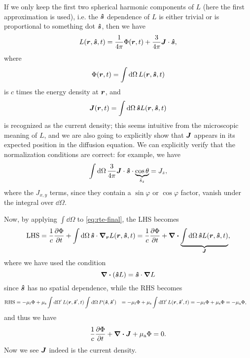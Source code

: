 \documentclass[hyperref, a4paper]{article}
\def\\{}%
\begin{document}
If we only keep the first two spherical harmonic components of $L$
(here the first approximation is used), 
i.e. the $\vu*{s}$ dependence of $L$ 
is either trivial 
or is proportional to something dot $\vu*{s}$, 
then we have
\begin{equation}
    L(\vb*{r}, \vu*{s}, t) = \frac{1}{4 \pi} \Phi(\vb*{r}, t) 
    + \frac{3}{4 \pi} \vb*{J} \cdot \vu*{s},
    \label{eq:diffusion-radiance}
\end{equation}
where 
\begin{equation}
    \Phi(\vb*{r}, t) = \int \dd{\Omega} L(\vb*{r}, \vu*{s}, t)
\end{equation}
is $c$ times the energy density at $\vb*{r}$, and 
\begin{equation}
    \vb*{J}(\vb*{r}, t) = \int \dd{\Omega} \vu*{s} L(\vb*{r}, \vu*{s}, t)
\end{equation}
is recognized as the current density; 
this seems intuitive from the microscopic meaning of $L$,
and we are also going to explicitly show that $\vb*{J}$
appears in its expected position in the diffusion equation.
We can explicitly verify that the normalization conditions are correct: 
for example, we have 
\begin{equation}
    \int \dd{\Omega} \frac{3}{4 \pi} \vb*{J} \cdot \vu*{s} \cdot \underbrace{\cos \theta}_{\hat{s}_z} = 
    J_z, 
\end{equation} 
where the $J_{x, y}$ terms, since they contain a $\sin \varphi$ or $\cos \varphi$ factor, 
vanish under the integral over $\dd \Omega$. 

Now, by applying $\int \dd{\Omega}$ to \eqref{eq:rte-final}, the LHS becomes 
\begin{equation}
    \text{LHS} = \frac{1}{c} \pdv{\Phi}{t} 
    + \int \dd{\Omega} \vu*{s} \cdot \grad_{\vb*{r}} L(\vb*{r}, \vu*{s}, t)
    = \frac{1}{c} \pdv{\Phi}{t} 
    + \div \underbrace{
        \int \dd{\Omega} \vu*{s}  L(\vb*{r}, \vu*{s}, t) 
    }_{\vb*{J}}, 
\end{equation}
where we have used the condition 
\begin{equation}
    \div(\vu*{s} L) = \vu*{s} \cdot \grad L
    \label{eq:move-grad-1}
\end{equation} 
since $\vu*{s}$ has no spatial dependence, 
while the RHS becomes 
\begin{equation}
    \begin{aligned}
        \text{RHS} &= - \mu_{t} \Phi 
        + \mu_{\text{s}} \int \dd{\Omega'} L(\vb*{r}, \vu*{s}', t) \int \dd{\Omega} P(\vu*{s}, \vu*{s}') \\
        &= - \mu_{t} \Phi 
        + \mu_{\text{s}} \int \dd{\Omega'} L(\vb*{r}, \vu*{s}', t) \\
        &= - \mu_{t} \Phi 
        + \mu_{\text{s}} \Phi = - \mu_{\text{a}} \Phi ,
    \end{aligned}
\end{equation}
and thus we have 
\begin{equation}
    \frac{1}{c} \pdv{\Phi}{t} + \div{\vb*{J}} + \mu_{\text{a}} \Phi = 0.
\end{equation}
Now we see $\vb*{J}$ indeed is the current density.
\end{document}
